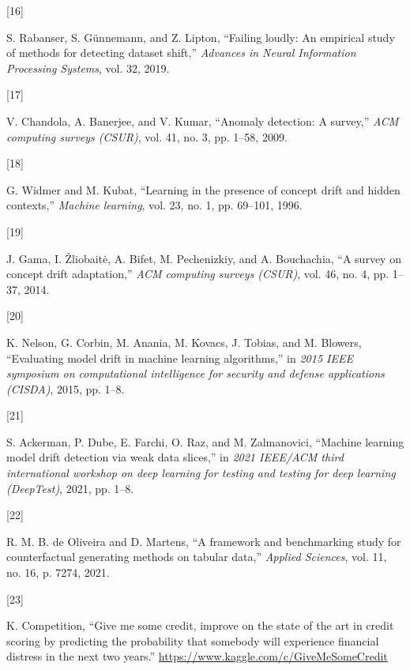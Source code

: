 \documentclass[
  conference]{IEEEtran}
\newlength{\cslhangindent}
\newlength{\csllabelwidth}
\newlength{\cslentryspacingunit} %
\newenvironment{CSLReferences}[2] %
 {%
  \setlength{\parindent}{0pt}
  \ifodd #1
  \let\oldpar\par
  \def\par{\hangindent=\cslhangindent\oldpar}
  \fi
  \setlength{\parskip}{#2\cslentryspacingunit}
 }%
 {}
\newcommand{\CSLLeftMargin}[1]{\parbox[t]{\csllabelwidth}{#1}}
\newcommand{\CSLRightInline}[1]{\parbox[t]{\linewidth - \csllabelwidth}{#1}\break}
\begin{document}
\begin{CSLReferences}{0}{0}
\leavevmode{}%
\CSLLeftMargin{{[}16{]} }%
\CSLRightInline{S. Rabanser, S. Günnemann, and Z. Lipton, {``Failing
loudly: An empirical study of methods for detecting dataset shift,''}
\emph{Advances in Neural Information Processing Systems}, vol. 32,
2019.}

\leavevmode{}%
\CSLLeftMargin{{[}17{]} }%
\CSLRightInline{V. Chandola, A. Banerjee, and V. Kumar, {``Anomaly
detection: A survey,''} \emph{ACM computing surveys (CSUR)}, vol. 41,
no. 3, pp. 1--58, 2009.}

\leavevmode{}%
\CSLLeftMargin{{[}18{]} }%
\CSLRightInline{G. Widmer and M. Kubat, {``Learning in the presence of
concept drift and hidden contexts,''} \emph{Machine learning}, vol. 23,
no. 1, pp. 69--101, 1996.}

\leavevmode{}%
\CSLLeftMargin{{[}19{]} }%
\CSLRightInline{J. Gama, I. Žliobaitė, A. Bifet, M. Pechenizkiy, and A.
Bouchachia, {``A survey on concept drift adaptation,''} \emph{ACM
computing surveys (CSUR)}, vol. 46, no. 4, pp. 1--37, 2014.}

\leavevmode{}%
\CSLLeftMargin{{[}20{]} }%
\CSLRightInline{K. Nelson, G. Corbin, M. Anania, M. Kovacs, J. Tobias,
and M. Blowers, {``Evaluating model drift in machine learning
algorithms,''} in \emph{2015 IEEE symposium on computational
intelligence for security and defense applications (CISDA)}, 2015, pp.
1--8.}

\leavevmode{}%
\CSLLeftMargin{{[}21{]} }%
\CSLRightInline{S. Ackerman, P. Dube, E. Farchi, O. Raz, and M.
Zalmanovici, {``Machine learning model drift detection via weak data
slices,''} in \emph{2021 IEEE/ACM third international workshop on deep
learning for testing and testing for deep learning (DeepTest)}, 2021,
pp. 1--8.}

\leavevmode{}%
\CSLLeftMargin{{[}22{]} }%
\CSLRightInline{R. M. B. de Oliveira and D. Martens, {``A framework and
benchmarking study for counterfactual generating methods on tabular
data,''} \emph{Applied Sciences}, vol. 11, no. 16, p. 7274, 2021.}

\leavevmode{}%
\CSLLeftMargin{{[}23{]} }%
\CSLRightInline{K. Competition, {``Give me some credit, improve on the
state of the art in credit scoring by predicting the probability that
somebody will experience financial distress in the next two years.''}
\url{https://www.kaggle.com/c/GiveMeSomeCredit}}


\end{CSLReferences}
\end{document}
